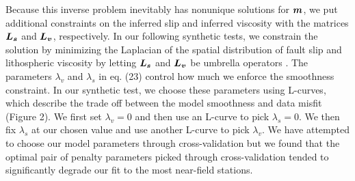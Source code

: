 \documentclass[extra]{gji}
\begin{document}
Because this inverse problem inevitably has nonunique solutions for
$\mitbf{m}$, we put additional constraints on the inferred slip and
inferred viscosity with the matrices $\mitbf{L_s}$ and $\mitbf{L_v}$,
respectively.  In our following synthetic tests, we constrain the
solution by minimizing the Laplacian of the spatial distribution of
fault slip and lithospheric viscosity by letting
$\mitbf{L_s}$ and $\mitbf{L_v}$ be umbrella operators \citep{D1999}.
The parameters $\lambda_v$ and $\lambda_s$ in eq. (23) control how
much we enforce the smoothness constraint.  In our synthetic test, we
choose these parameters using L-curves, which describe the trade off
between the model smoothness and data misfit (Figure 2).  We first set
$\lambda_v=0$ and then use an L-curve to pick $\lambda_s=0$.  We then
fix $\lambda_s$ at our chosen value and use another L-curve to pick
$\lambda_v$.  We have attempted to choose our model parameters through
cross-validation but we found that the optimal pair of penalty
parameters picked through cross-validation tended to significantly
degrade our fit to the most near-field stations.
\end{document}
